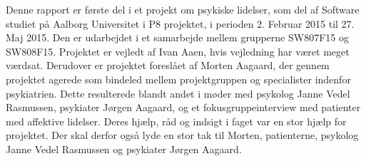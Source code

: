 Denne rapport er første del i et projekt om psykiske lidelser, som del af Software studiet på Aalborg Universitet i P8 projektet, i perioden 2. Februar 2015 til 27. Maj 2015. 
Den er udarbejdet i et samarbejde mellem grupperne SW807F15 og SW808F15.
Projektet er vejledt af Ivan Aaen, hvis vejledning har været meget værdsat.
Derudover er projektet foreslået af Morten Aagaard, der gennem projektet agerede som bindeled mellem projektgruppen og specialister indenfor psykiatrien.
Dette resulterede blandt andet i møder med psykolog Janne Vedel Rasmussen, psykiater Jørgen Aagaard, og et fokusgruppeinterview med patienter med affektive lidelser.
Deres hjælp, råd og indsigt i faget var en stor hjælp for projektet.
Der skal derfor også lyde en stor tak til Morten, patienterne, psykolog Janne Vedel Rasmussen og psykiater Jørgen Aagaard.
